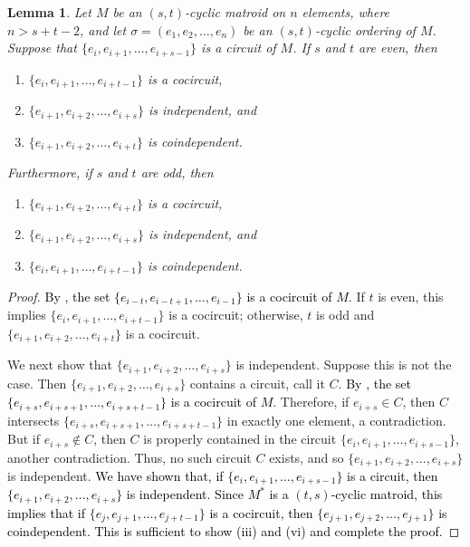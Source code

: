 \documentclass[11pt]{amsart}
\newtheorem{lemma}[theorem]{Lemma}
\newcommand{\bloo}{\textcolor{black}}
\begin{document}
\begin{lemma}
\label{structure}
Let $M$ be an $(s, t)$-cyclic matroid on $n$ elements, where $\left.n > s+t-2\right.$, and let $\sigma=(e_1, e_2, \ldots, e_n)$ be an $(s, t)$-cyclic ordering of $M$. Suppose that $\{e_i, e_{i+1}, \ldots, e_{i+s-1}\}$ is a circuit of $M$. If $s$ and $t$ are even, then
\begin{enumerate}[{\rm (i)}]
\item $\{e_i, e_{i+1}, \ldots, e_{i+t-1}\}$ is a cocircuit,

\item $\{e_{i+1}, e_{i+2}, \ldots, e_{i+s}\}$ is independent, and

\item $\{e_{i+1}, e_{i+2}, \ldots, e_{i+t}\}$ is coindependent. 
\end{enumerate}
Furthermore, if $s$ and $t$ are odd, then
\begin{enumerate}
\item[{\rm (iv)}] $\{e_{i+1},e_{i+2}, \ldots, e_{i+t}\}$ is a cocircuit,

\item[{\rm (v)}] $\{e_{i+1}, e_{i+2}, \ldots, e_{i+s}\}$ is independent, and

\item[{\rm (vi)}] $\{e_i,e_{i+1},\ldots,e_{i+t-1}\}$ is coindependent.
\end{enumerate}
\end{lemma}

\begin{proof}
\bloo{By , the set $\{e_{i-t},e_{i-t+1},\ldots,e_{i-1}\}$ is a cocircuit of $M$.} If $t$ is even, this implies $\{e_i,e_{i+1},\ldots,e_{i+t-1}\}$ is a cocircuit; otherwise, $t$ is odd and $\{e_{i+1},e_{i+2},\ldots,e_{i+t}\}$ is a cocircuit. 	
	
We next show that $\{e_{i+1},e_{i+2},\ldots,e_{i+s}\}$ is independent. Suppose this is not the case. Then $\{e_{i+1}, e_{i+2}, \ldots, e_{i+s}\}$ contains a circuit, call it $C$. \bloo{By , the set $\{e_{i+s}, e_{i+s+1}, \ldots, e_{i+s+t-1}\}$ is a cocircuit of $M$}. Therefore, if $e_{i+s} \in C$, then $C$ intersects $\{e_{i+s},e_{i+s+1},\ldots,e_{i+s+t-1}\}$ in exactly one element, a contradiction. But if $e_{i+s} \notin C$, then $C$ is properly contained in the circuit $\{e_i,e_{i+1},\ldots,e_{i+s-1}\}$, another contradiction. Thus, no such circuit $C$ exists, and so $\{e_{i+1},e_{i+2},\ldots,e_{i+s}\}$ is independent. \bloo{We have shown that, if $\{e_i,e_{i+1},\ldots,e_{i+s-1}\}$ is a circuit, then $\{e_{i+1},e_{i+2},\ldots,e_{i+s}\}$ is independent. Since $M^*$ is a $(t,s)$-cyclic matroid, this implies that if $\{e_j,e_{j+1},\ldots,e_{j+t-1}\}$ is a cocircuit, then $\{e_{j+1},e_{j+2},\ldots,e_{j+1}\}$ is coindependent. This is sufficient to show (iii) and (vi) and complete the proof.}
\end{proof}
\end{document}

